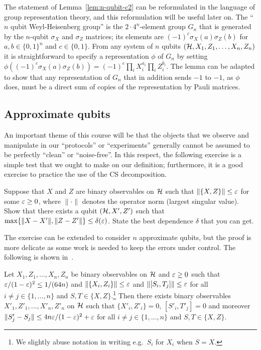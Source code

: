 \begin{remark}
The statement of Lemma~\ref{lem:n-qubit-c2} can be reformulated in the language of group representation theory, and this reformulation will be useful later on. The ``$n$ qubit Weyl-Heisenberg group'' is the $2\cdot 4^n$-element group $G_n$ that is generated by the $n$-qubit $\sigma_X$ and $\sigma_Z$ matrices; its elements are $(-1)^c\sigma_X(a)\sigma_Z(b)$ for $a,b\in\{0,1\}^n$ and $c\in\{0,1\}$. From any system of $n$ qubits $(\mathcal{H},X_1,Z_1,\ldots,X_n,Z_n)$ it is straightforward to specify a representation $\phi$ of $G_n$ by setting $\phi((-1)^c\sigma_X(a)\sigma_Z(b)) = (-1)^c \prod_i X_i^{a_i} \prod_i Z_i^{b_i}$. The lemma can be adapted to show that any representation of $G_n$ that in addition sends $-1$ to $-1$, as $\phi$ does, must be a direct sum of copies of the representation by Pauli matrices. 
\end{remark}

\subsection{Approximate qubits}

An important theme of this course will be that the objects that we observe and manipulate in our ``protocols'' or ``experiments'' generally cannot be assumed to be perfectly ``clean'' or ``noise-free''. In this respect, the following exercise is a simple test that we ought to make on our definition; furthermore, it is a good exercise to practice the use of the CS decomposition. 

\begin{exercise}
Suppose that $X$ and $Z$ are binary observables on $\mathcal{H}$ such that $\|\{X,Z\}\|\leq \varepsilon$ for some $\varepsilon \geq 0$, where $\|\cdot\|$ denotes the operator norm (largest singular value). Show that there exists a qubit $(\mathcal{H},X',Z')$ such that $\max\{\|X-X'\|,\|Z-Z'\|\} \leq \delta(\varepsilon)$. State the best dependence $\delta$ that you can get. 
\end{exercise} 

The exercise can be extended to consider $n$ approximate qubits, but the proof is more delicate as some work is needed to keep the errors under control. The following is shown in~\cite{chao2017overlapping}. 

\begin{theorem}
Let $X_1,Z_1,\ldots,X_n,Z_n$ be binary observables on $\mathcal{H}$ and $\varepsilon \geq 0$ such that $\varepsilon/(1-\varepsilon)^2 \leq 1/(64n)$ and $\|\{X_i,Z_i\}\|\leq \varepsilon$ and $\|[S_i,T_j]\|\leq \varepsilon$ for all $i\neq j \in \{1,\ldots, n\}$ and $S,T \in \{X,Z\}$.\footnote{We slightly abuse notation in writing e.g.\ $S_i$ for $X_i$ when $S=X$.} Then there exists  binary observables $X'_1,Z'_1,\ldots,X'_n,Z'_n$ on $\mathcal{H}$ such that $\{X'_i,Z'_i\}=0$, $[S'_i,T'_j]=0$ and moreover $\|S'_j-S_j\| \leq 4n\varepsilon/(1-\varepsilon)^2 + \varepsilon$ for all $i\neq j\in \{1,\ldots,n\}$ and $S,T\in\{X,Z\}$.
\end{theorem}

